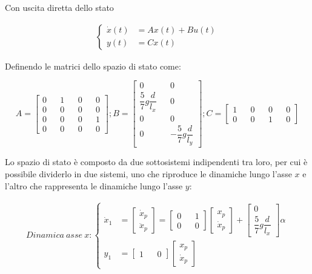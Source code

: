 Con uscita diretta dello stato

\begin{align}
	\begin{cases}
		\dot{x}(t) &= Ax(t) + Bu(t)	\\
		y(t) &= Cx(t)
	\end{cases}
\end{align}

Definendo le matrici dello spazio di stato come:

\begin{equation}
	A=
	\begin{bmatrix}
		0 && 1 && 0 && 0 \\
		0 && 0 && 0 && 0 \\
		0 && 0 && 0 && 1 \\
		0 && 0 && 0 && 0
	\end{bmatrix}
	;
	B=
	\begin{bmatrix}
		0	&&	0	\\
		\dfrac{5}{7}g\dfrac{d}{l_{x}}	&&	0	\\
		0	&&	0	\\
		0	&& -\dfrac{5}{7}g\dfrac{d}{l_{y}}
	\end{bmatrix}
	;
	C=
	\begin{bmatrix}
	1 && 0 && 0 && 0 \\
	0 && 0 && 1 && 0
	\end{bmatrix}
\end{equation}

Lo spazio di stato è composto da due sottosistemi indipendenti tra loro, per cui è possibile dividerlo in due sistemi, uno che riproduce le dinamiche lungo l'asse $x$ e l'altro che rappresenta le dinamiche lungo l'asse $y$:

\begin{align}
	Dinamica\ asse\ x:
	\begin{cases}
		\dot{x}_{1}&=
		\begin{bmatrix}
			\dot{x}_{p} \\ \ddot{x}_{p}
		\end{bmatrix}
		=
		\begin{bmatrix}
			0 && 1 \\ 0 && 0
		\end{bmatrix}
		\begin{bmatrix}
			x_{p}	\\ \dot{x}_{p}
		\end{bmatrix}
		+
		\begin{bmatrix}
			0	\\	\dfrac{5}{7}g\dfrac{d}{l_{x}}
		\end{bmatrix}
		\alpha
		\\
		y_{1}&=
		\begin{bmatrix}
			1 && 0
		\end{bmatrix}
		\begin{bmatrix}
			x_{p} \\ \dot{x}_{p}
		\end{bmatrix}
	\end{cases}
\end{align}

